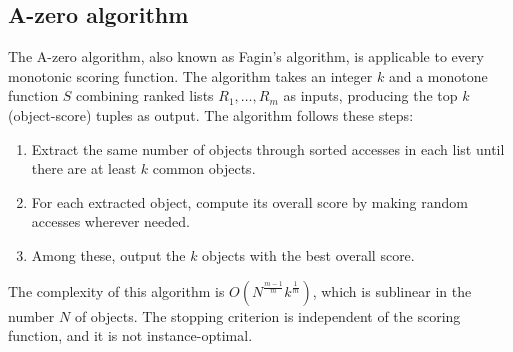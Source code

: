 \subsection{A-zero algorithm}
The A-zero algorithm, also known as Fagin's algorithm, is applicable to every monotonic scoring function. 
The algorithm takes an integer $k$ and a monotone function $S$ combining ranked lists $R_1,\dots,R_m$ as inputs, producing the top $k$ (object-score) tuples as output.
The algorithm follows these steps:
\begin{enumerate}
    \item Extract the same number of objects through sorted accesses in each list until there are at least $k$ common objects.
    \item For each extracted object, compute its overall score by making random accesses wherever needed.
    \item Among these, output the $k$ objects with the best overall score. 
\end{enumerate}
The complexity of this algorithm is $O(N^{\frac{m-1}{m}}k^{\frac{1}{m}})$, which is sublinear in the number $N$ of objects. 
The stopping criterion is independent of the scoring function, and it is not instance-optimal.
